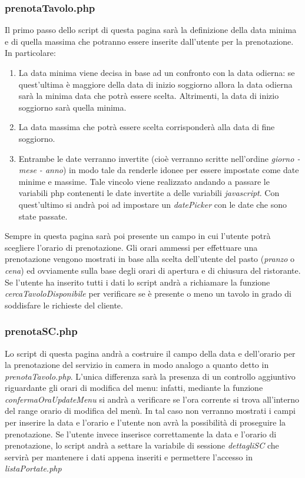 \documentclass [a4paper, 12pt]{book}
\begin{document}
\subsubsection{prenotaTavolo.php}
Il primo passo dello script di questa pagina sarà la definizione della data minima e di quella massima che potranno essere inserite dall'utente per la prenotazione. In particolare:
\begin{enumerate}
\item La data minima viene decisa in base ad un confronto con la data odierna: se quest'ultima è maggiore della data di inizio soggiorno allora la data odierna sarà la minima data che potrà essere scelta. Altrimenti, la data di inizio soggiorno sarà quella minima.
\item La data massima che potrà essere scelta corrisponderà alla data di fine soggiorno.
\item Entrambe le date verranno invertite (cioè verranno scritte nell'ordine \textit{giorno - mese - anno}) in modo tale da renderle idonee per essere impostate come date minime e massime. Tale vincolo viene realizzato andando a passare le variabili php contenenti le date invertite a delle variabili \textit{javascript}. Con quest'ultimo si andrà poi ad impostare un \textit{datePicker} con le date che sono state passate.
\end{enumerate}
Sempre in questa pagina sarà poi presente un campo in cui l'utente potrà scegliere l'orario di prenotazione. Gli orari ammessi per effettuare una prenotazione vengono mostrati in base alla scelta dell'utente del pasto (\textit{pranzo} o \textit{cena}) ed ovviamente sulla base degli orari di apertura e di chiusura del ristorante. Se l'utente ha inserito tutti i dati lo script andrà a richiamare la funzione \textit{cercaTavoloDisponibile} per verificare se è presente o meno un tavolo in grado di soddisfare le richieste del cliente.

\subsubsection{prenotaSC.php}
Lo script di questa pagina andrà a costruire il campo della data e dell'orario per la prenotazione del servizio in camera in modo analogo a quanto detto in \textit{prenotaTavolo.php}. L'unica differenza sarà la presenza di un controllo aggiuntivo riguardante gli orari di modifica del menu: infatti, mediante la funzione \textit{confermaOraUpdateMenu} si andrà a verificare se l'ora corrente si trova all'interno del range orario di modifica del menù. In tal caso non verranno mostrati i campi per inserire la data e l'orario e l'utente non avrà la possibilità di proseguire la prenotazione. Se l'utente invece inserisce correttamente la data e l'orario di prenotazione, lo script andrà a settare la variabile di sessione \textit{dettagliSC} che servirà per mantenere i dati appena inseriti e permettere l'accesso in \textit{listaPortate.php}
\end{document}
